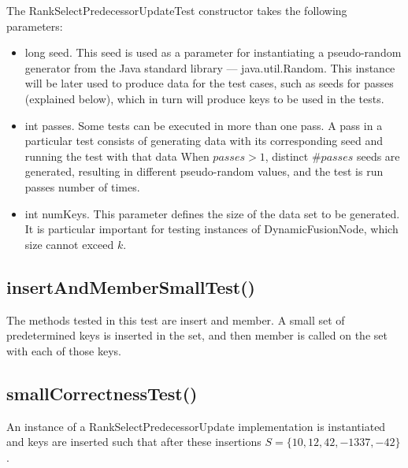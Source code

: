 The {\ttfamily RankSelectPredecessorUpdateTest} constructor takes the following parameters:
\begin{itemize}
    \item
    {\ttfamily long seed}.
    This seed is used as a parameter for instantiating a pseudo-random generator from the Java standard library --- {\ttfamily java.util.Random}.
    This instance will be later used to produce data for the test cases, such as seeds for passes (explained below), which in turn will produce keys to be used in the tests.
    
    \item {\ttfamily int passes}.
    Some tests can be executed in more than one pass. A pass in a particular test consists of generating data with its corresponding seed and running the test with that data
    When $passes > 1$, distinct $\#passes$ seeds are generated, resulting in different pseudo-random values, and the test is run {\ttfamily passes} number of times.
    
    \item {\ttfamily int numKeys}.
    This parameter defines the size of the data set to be generated.
    It is particular important for testing instances of {\ttfamily DynamicFusionNode}, which size cannot exceed $k$.
\end{itemize}

\subsection{{\ttfamily insertAndMemberSmallTest()}} \label{sec:insertAndMemberSmallTest}
The methods tested in this test are {\ttfamily insert} and {\ttfamily member}. A small set of predetermined keys is inserted in the set, and then {\ttfamily member} is called on the set with each of those keys. 

\subsection{{\ttfamily smallCorrectnessTest()}}

An instance of a {\ttfamily RankSelectPredecessorUpdate} implementation is instantiated and keys are inserted such that after these insertions $S = \{10, 12, 42, -1337, -42\}$.

